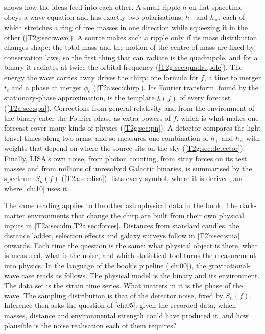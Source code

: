  shows how the ideas feed into each other. A small ripple $h$ on flat spacetime obeys a wave equation and has exactly two polarisations, $h_+$ and $h_\times$, each of which stretches a ring of free masses in one direction while squeezing it in the other (\cref{T2g:sec:wave}). A source makes such a ripple only if its mass distribution changes shape: the total mass and the motion of the centre of mass are fixed by conservation laws, so the first thing that can radiate is the quadrupole, and for a binary it radiates at twice the orbital frequency (\cref{T2g:sec:quadrupole}). The energy the wave carries away drives the chirp: one formula for $\dot f$, a time to merger $t_c$ and a phase at merger $\phi_c$ (\cref{T2a:sec:chirp}). Its Fourier transform, found by the stationary-phase approximation, is the template $\tilde h(f)$ of every forecast (\cref{T2a:sec:spa}). Corrections from general relativity and from the environment of the binary enter the Fourier phase as extra powers of $f$, which is what makes one forecast cover many kinds of physics (\cref{T2g:sec:pn}). A detector compares the light travel times along two arms, and so measures one combination of $h_+$ and $h_\times$ with weights that depend on where the source sits on the sky (\cref{T2g:sec:detector}). Finally, LISA's own noise, from photon counting, from stray forces on its test masses and from millions of unresolved Galactic binaries, is summarised by the spectrum $S_n(f)$ (\cref{T2a:sec:lisa}).  lists every symbol, where it is derived, and where \cref{ch:10} uses it.

The same reading applies to the other astrophysical data in the book. The dark-matter environments that change the chirp are built from their own physical inputs in \cref{T2a:sec:dm,T2a:sec:forces}. Distances from standard candles, the distance ladder, selection effects and galaxy surveys follow in \cref{T2b:sec:snia} onwards. Each time the question is the same: what physical object is there, what is measured, what is the noise, and which statistical tool turns the measurement into physics. In the language of the book's pipeline (\cref{ch:00}), the gravitational-wave case reads as follows. The physical model is the binary and its environment. The data set is the strain time series. What matters in it is the phase of the wave. The sampling distribution is that of the detector noise, fixed by $S_n(f)$. Inference then asks the question of \cref{ch:05}: given the recorded data, which masses, distance and environmental strength could have produced it, and how plausible is the noise realisation each of them requires?

